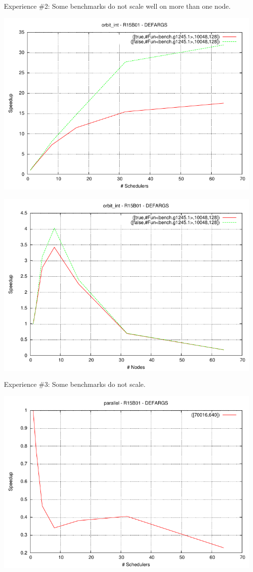 \documentclass{beamer}
\begin{document}
\begin{frame}{Experience \#2: Some benchmarks do not scale well on more than one node.}
  \begin{overprint}
    \begin{center}
    \includegraphics[width=0.8\linewidth]{figures/orbit_int_par-speedup-bulldozer.pdf}
    \end{center}
    \begin{center}
    \includegraphics[width=0.8\linewidth]{figures/orbit_int_dist-speedup-bulldozer.pdf}
    \end{center}
  \end{overprint}
\end{frame}

\begin{frame}{Experience \#3: Some benchmarks do not scale.}
    \begin{center}
        \includegraphics[width=0.8\linewidth]{figures/parallel-speedup-bulldozer.pdf}
    \end{center}
\end{frame}
\end{document}
